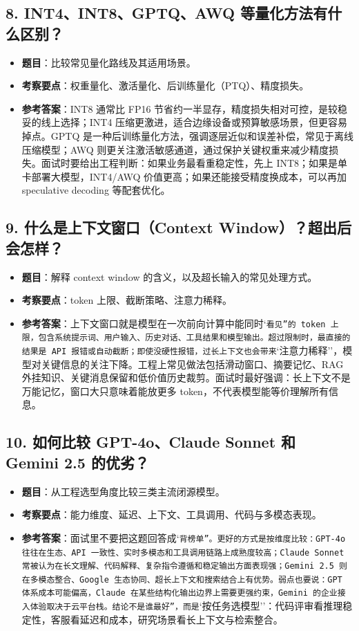 \subsection{8. INT4、INT8、GPTQ、AWQ 等量化方法有什么区别？}
\begin{itemize}[leftmargin=2em]
\item \textbf{题目}：比较常见量化路线及其适用场景。
\item \textbf{考察要点}：权重量化、激活量化、后训练量化（PTQ）、精度损失。
\item \textbf{参考答案}：INT8 通常比 FP16 节省约一半显存，精度损失相对可控，是较稳妥的线上选择；INT4 压缩更激进，适合边缘设备或预算敏感场景，但更容易掉点。GPTQ 是一种后训练量化方法，强调逐层近似和误差补偿，常见于离线压缩模型；AWQ 则更关注激活敏感通道，通过保护关键权重来减少精度损失。面试时要给出工程判断：如果业务最看重稳定性，先上 INT8；如果是单卡部署大模型，INT4/AWQ 价值更高；如果还能接受精度换成本，可以再加 speculative decoding 等配套优化。
\end{itemize}

\subsection{9. 什么是上下文窗口（Context Window）？超出后会怎样？}
\begin{itemize}[leftmargin=2em]
\item \textbf{题目}：解释 context window 的含义，以及超长输入的常见处理方式。
\item \textbf{考察要点}：token 上限、截断策略、注意力稀释。
\item \textbf{参考答案}：上下文窗口就是模型在一次前向计算中能同时`\texttt{看见''的 token 上限，包含系统提示词、用户输入、历史对话、工具结果和模型输出。超过限制时，最直接的结果是 API 报错或自动截断；即使没硬性报错，过长上下文也会带来}`注意力稀释''，模型对关键信息的关注下降。工程上常见做法包括滑动窗口、摘要记忆、RAG 外挂知识、关键消息保留和低价值历史裁剪。面试时最好强调：长上下文不是万能记忆，窗口大只意味着能放更多 token，不代表模型能等价理解所有信息。
\end{itemize}

\subsection{10. 如何比较 GPT-4o、Claude Sonnet 和 Gemini 2.5 的优劣？}
\begin{itemize}[leftmargin=2em]
\item \textbf{题目}：从工程选型角度比较三类主流闭源模型。
\item \textbf{考察要点}：能力维度、延迟、上下文、工具调用、代码与多模态表现。
\item \textbf{参考答案}：面试里不要把这题回答成`\texttt{背榜单''。更好的方式是按维度比较：GPT-4o 往往在生态、API 一致性、实时多模态和工具调用链路上成熟度较高；Claude Sonnet 常被认为在长文理解、代码解释、复杂指令遵循和稳定输出方面表现强；Gemini 2.5 则在多模态整合、Google 生态协同、超长上下文和搜索结合上有优势。弱点也要说：GPT 体系成本可能偏高，Claude 在某些结构化输出边界上需要更强约束，Gemini 的企业接入体验取决于云平台栈。结论不是}\texttt{谁最好''，而是}`按任务选模型''：代码评审看推理稳定性，客服看延迟和成本，研究场景看长上下文与检索整合。
\end{itemize}


